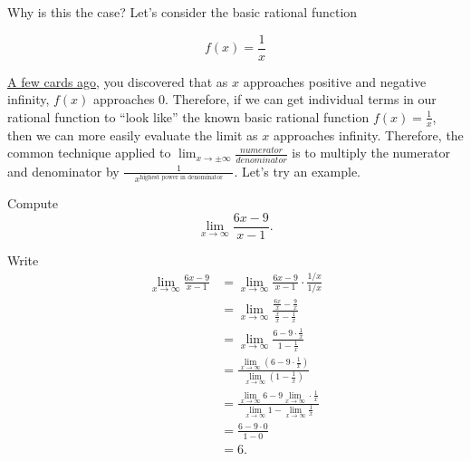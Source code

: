 \documentclass{ximera}
\begin{document}
Why is this the case? Let's consider the basic rational function

\[
f(x) = \frac{1}{x}
\]
\begin{image}
\end{image}

\href{https://ximera.osu.edu/math160fa17/m160exam1content/asymptotesAsLimits/breakGround}{A few cards ago}, you discovered that as $x$ approaches positive and negative infinity, $f(x)$ approaches $0$. Therefore, if we can get individual terms in our rational function to ``look like'' the known basic rational function $f(x)=\frac{1}{x}$, then we can more easily evaluate the limit as $x$ approaches infinity. Therefore, the common technique applied to $\displaystyle\lim_{x\to \pm \infty}\frac{numerator}{denominator}$ is to multiply the numerator and denominator by $\displaystyle\frac{1}{\phantom{xx}x^{\text{highest power in denominator}}\phantom{xx}}$.  Let's try an example. 

\begin{example} Compute
\[
\lim_{x\to\infty} \frac{6x-9}{x-1}.
\]
\begin{explanation}
Write
\begin{align*}
\lim_{x\to\infty}\frac{6x-9}{x-1} &= \lim_{x\to\infty}\frac{6x-9}{x-1}\cdot \frac{1/x}{1/x}\\
&=\lim_{x\to\infty}\frac{\frac{6x}{x} - \frac{9}{x}}{\frac{x}{x} - \frac{1}{x}}\\
&=\lim_{x\to\infty}\frac{6 - 9 \cdot \frac{1}{x}}{1 - \frac{1}{x}}\\
&=\frac{\displaystyle\lim_{x\to\infty} \left( 6 - 9 \cdot \frac{1}{x}\right)}{\displaystyle\lim_{x\to\infty} \left( 1 - \frac{1}{x} \right)} \\
&=\frac{\displaystyle\lim_{x\to\infty} 6 - 9 \displaystyle\lim_{x\to\infty} \cdot \frac{1}{x}}{\displaystyle\lim_{x\to\infty} 1 - \displaystyle\lim_{x\to\infty} \frac{1}{x}} \\
&=\frac{6 - 9 \cdot 0}{1 - 0} \\
&= 6.
\end{align*}
\end{explanation}
\end{example}
\end{document}
